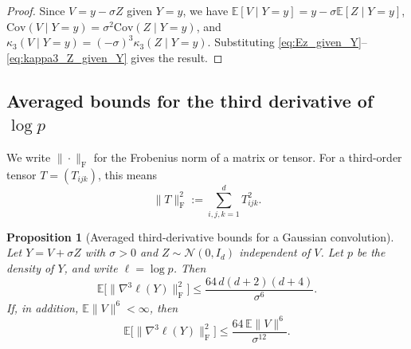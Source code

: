 \documentclass[11pt]{article}
\def\E{\mathbb{E}}
\newcommand{\norm}[1]{\|#1\|}
\newcommand{\Cov}{\mathrm{Cov}}
\newcommand{\frobnorm}[1]{\|#1\|_{\mathrm{F}}}
\newtheorem{prop}{Proposition}
\begin{document}
\begin{proof}
Since \(V=y-\sigma Z\) given \(Y=y\), we have \(\E[V\mid Y=y]=y-\sigma\E[Z\mid Y=y]\), \(\Cov(V\mid Y=y)=\sigma^2\Cov(Z\mid Y=y)\), and \(\kappa_3(V\mid Y=y)=(-\sigma)^3\kappa_3(Z\mid Y=y)\). Substituting \eqref{eq:Ez_given_Y}--\eqref{eq:kappa3_Z_given_Y} gives the result.
\end{proof}

\subsection{Averaged bounds for the third derivative of \(\log p\)}

We write \(\frobnorm{\cdot}\) for the Frobenius norm of a matrix or tensor. For a third-order tensor \(T=(T_{ijk})\), this means
\[
\frobnorm{T}^2 := \sum_{i,j,k=1}^d T_{ijk}^2.
\]

\begin{prop}[Averaged third-derivative bounds for a Gaussian convolution]
\label{prop:avg_third_derivative}
Let \(Y=V+\sigma Z\) with \(\sigma>0\) and \(Z\sim\mathcal N(0,I_d)\) independent of \(V\). Let \(p\) be the density of \(Y\), and write \(\ell=\log p\). Then
\begin{equation}
\label{eq:avg_third_universal}
\E\big[\frobnorm{\nabla^3\ell(Y)}^2\big]
\le
\frac{64\,d(d+2)(d+4)}{\sigma^6}.
\end{equation}
If, in addition, \(\E\norm{V}^6<\infty\), then
\begin{equation}
\label{eq:avg_third_refined}
\E\big[\frobnorm{\nabla^3\ell(Y)}^2\big]
\le
\frac{64\,\E\norm{V}^6}{\sigma^{12}}.
\end{equation}
\end{prop}
\end{document}
